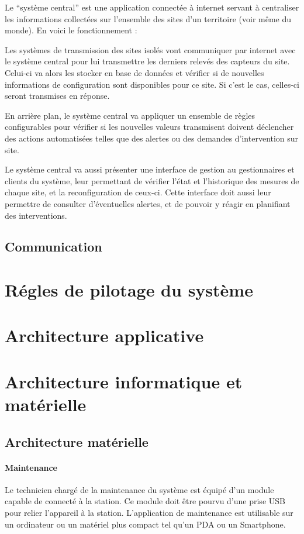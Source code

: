 Le ``système central'' est une application connectée à internet servant à centraliser les informations collectées sur l'ensemble des sites d'un territoire (voir même du monde). En voici le fonctionnement :

Les systèmes de transmission des sites isolés vont communiquer par internet avec le système central pour lui transmettre les derniers relevés des capteurs du site. Celui-ci va alors les stocker en base de données et vérifier si de nouvelles informations de configuration sont disponibles pour ce site. Si c'est le cas, celles-ci seront transmises en réponse.

En arrière plan, le système central va appliquer un ensemble de règles configurables pour vérifier si les nouvelles valeurs transmisent doivent déclencher des actions automatisées telles que des alertes ou des demandes d'intervention sur site.

Le système central va aussi présenter une interface de gestion au gestionnaires et clients du système, leur permettant de vérifier l'état et l'historique des mesures de chaque site, et la reconfiguration de ceux-ci. Cette interface doit aussi leur permettre de consulter d'éventuelles alertes, et de pouvoir y réagir en planifiant des interventions.

\subsection{Communication}

\section{Régles de pilotage du système}

\section{Architecture applicative}

\section{Architecture informatique et matérielle}
\subsection{Architecture matérielle}
\paragraph{Maintenance} Le technicien chargé de la maintenance du système est équipé d’un module capable de connecté à la station. Ce module doit être pourvu d’une prise USB pour relier l’appareil à la station. L’application de maintenance est utilisable sur un ordinateur  ou un matériel plus compact tel qu’un PDA ou un Smartphone. 
